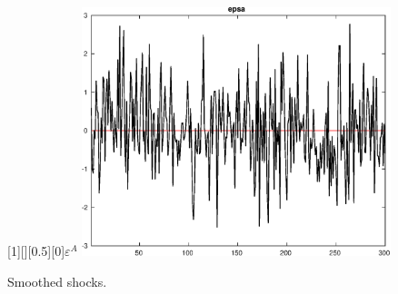  
\begin{figure}[H]
[1][][0.5][0]{$ {\varepsilon^A} $}
\centering 
\includegraphics[width=0.80\textwidth]{KimModTheBuilder_SmoothedShocks1}
\caption{Smoothed shocks.}\label{Fig:SmoothedShocks:1}
\end{figure}


